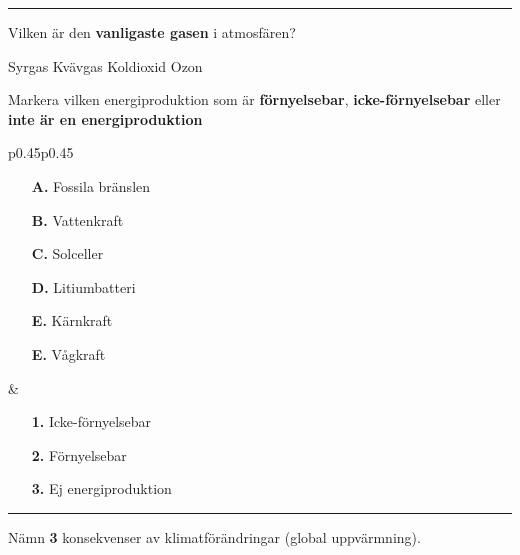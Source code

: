 \documentclass{exam}
\begin{document}
\begin{questions}
\vspace{5mm} 
\hrule 
\vspace{5mm} 

\question Vilken är den \textbf{vanligaste gasen} i atmosfären?
\begin{checkboxes}
   \choice Syrgas
   \correctchoice Kvävgas
   \choice Koldioxid
   \choice Ozon
\end{checkboxes}

\break


\vspace{5mm} %
\begin{center}
\end{center}
\vspace{5mm} %
\question Markera vilken energiproduktion som är \textbf{förnyelsebar}, \textbf{icke-förnyelsebar} eller \textbf{inte är en energiproduktion}

\begin{tabular}{p{0.45\textwidth}p{0.45\textwidth}}
  \begin{minipage}[t]{\linewidth}
    \begin{itemize}
      \item[\textbf{A.}] Fossila bränslen
      \item[\textbf{B.}] Vattenkraft
      \item[\textbf{C.}] Solceller
      \item[\textbf{D.}] Litiumbatteri
      \item[\textbf{E.}] Kärnkraft
      \item[\textbf{E.}] Vågkraft
    \end{itemize}
  \end{minipage}
  &
  \begin{minipage}[t]{\linewidth}
    \begin{itemize}
      \item[\textbf{1.}] Icke-förnyelsebar
      \item[\textbf{2.}] Förnyelsebar
      \item[\textbf{3.}] Ej energiproduktion
    \end{itemize}
  \end{minipage}
\end{tabular}
\vspace{5mm} 
\hrule 
\vspace{5mm}
\question 
Nämn \textbf{3} konsekvenser av klimatförändringar (global uppvärmning).


\end{questions}
\end{document}
